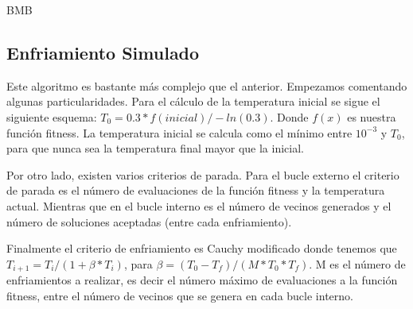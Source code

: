 \documentclass[10pt, a4paper]{article}
\makeatletter
\def\BState{\State\hskip-\ALG@thistlm}
\theoremstyle{theorem-style}
\theoremstyle{theorem-style}
\theoremstyle{theorem2-style}
\theoremstyle{definition-style}
\theoremstyle{remark-style}
\theoremstyle{example-style}
\theoremstyle{definition-style}
\theoremstyle{remark-style}
\theoremstyle{remark-style}
\makeatother
\begin{document}
\begin{algorithm}
\caption{BMB}\label{euclid}
\end{algorithm}

\subsection{Enfriamiento Simulado}

Este algoritmo es bastante más complejo que el anterior. Empezamos comentando algunas particularidades. Para el cálculo de la temperatura inicial se sigue el siguiente esquema: $T_0 = 0.3 * f(inicial) / -ln(0.3)$. Donde $f(x)$ es nuestra función fitness. La temperatura inicial se calcula como el mínimo entre $10^{-3}$ y $T_0$, para que nunca sea la temperatura final mayor que la inicial.

Por otro lado, existen varios criterios de parada. Para el bucle externo el criterio de parada es el número de evaluaciones de la función fitness y la temperatura actual. Mientras que en el bucle interno es el número de vecinos generados y el número de soluciones aceptadas (entre cada enfriamiento).

Finalmente el criterio de enfriamiento es Cauchy modificado donde tenemos que $T_{i+1} = T_i / (1 + \beta * T_i)$, para $\beta = (T_0 - T_f) / (M * T_0 * T_f)$. M es el número de enfriamientos a realizar, es decir el número máximo de evaluaciones a la función fitness, entre el número de vecinos que se genera en cada bucle interno. 
\end{document}
